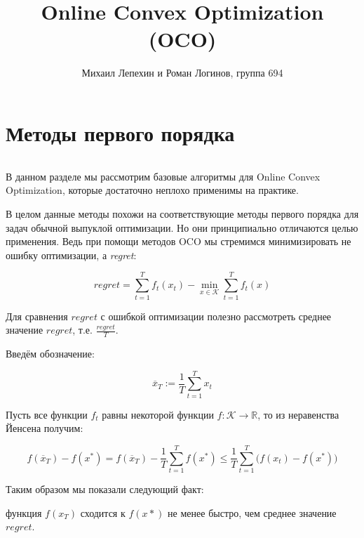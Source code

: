 \documentclass[12pt]{article}
\author{Михаил Лепехин и Роман Логинов, группа 694}
\title{Online Convex Optimization (OCO)}
\begin{document}
  \maketitle

\section*{Методы первого порядка}
$ $

В данном разделе мы рассмотрим базовые алгоритмы для Online Convex Optimization, которые достаточно неплохо применимы на практике.

В целом данные методы похожи на соответствующие методы первого порядка для задач обычной выпуклой оптимизации. Но они принципиально отличаются целью применения. Ведь при помощи методов OCO мы стремимся минимизировать не ошибку оптимизации, а \textit{regret}:

$$regret = \sum\limits_{t=1}^T f_t(x_t) - \min\limits_{x \in \mathcal{K}} \sum\limits_{t=1}^T f_t(x)$$

Для сравнения $regret$ с ошибкой оптимизации полезно рассмотреть среднее значение $regret$, т.е. $\frac{regret}{T}$.

Введём обозначение:

$$\overline{x}_T := \frac{1}{T}\sum\limits_{t=1}^T x_t$$

Пусть все функции $f_t$ равны некоторой функции $f : \mathcal{K} \rightarrow \mathbb{R}$, то из неравенства Йенсена получим:

$$f(\overline{x}_T)-f(x^*) = f(\overline{x}_T)- \frac{1}{T} \sum\limits_{t=1}^T f(x^*) \leq \frac{1}{T}\sum\limits_{t=1}^T \big(f(x_t)-   f(x^*)\big)$$

Таким образом мы показали следующий факт: 

функция $f(x_T)$ сходится к $f(x*)$ не менее быстро, чем среднее значение $regret$.
\end{document}

